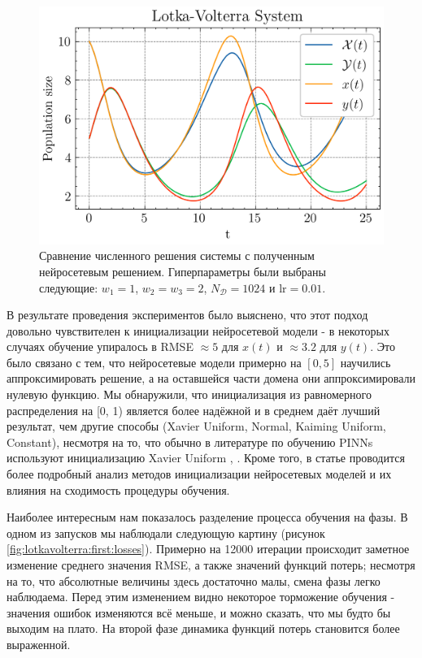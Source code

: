 \documentclass[a4paper, 12pt]{article}
\begin{document}
\begin{figure}
    \centering
    \includegraphics{../images/lotkavolterra/first approach/Lotka-Volterra System.png}
    \caption{Сравнение численного решения системы с полученным нейросетевым решением. Гиперпараметры были выбраны следующие: $w_1 = 1$, $w_2 = w_3 = 2$, $N_\mathcal{D} = 1024$ и $\mathrm{lr} = 0.01$.}
    \label{fig:lotkavolterra:first:solution}
\end{figure}

В результате проведения экспериментов было выяснено, что этот подход довольно чувствителен к инициализации нейросетевой модели - в некоторых случаях обучение упиралось в RMSE $\approx 5$ для $x(t)$ и $\approx 3.2$ для $y(t)$. Это было связано с тем, что нейросетевые модели примерно на $[0, 5]$ научились аппроксимировать решение, а на оставшейся части домена они аппроксимировали нулевую функцию. Мы обнаружили, что инициализация из равномерного распределения на [0, 1) является более надёжной и в среднем даёт лучший результат, чем другие способы (Xavier Uniform, Normal, Kaiming Uniform, Constant), несмотря на то, что обычно в литературе по обучению PINNs используют инициализацию Xavier Uniform \cite{rathore2024challenges}, \cite{wang2020pinns}. Кроме того, в статье \cite{Pang_2019} проводится более подробный анализ методов инициализации нейросетевых моделей и их влияния на сходимость процедуры обучения.

Наиболее интересным нам показалось разделение процесса обучения на фазы. В одном из запусков мы наблюдали следующую картину (рисунок \ref{fig:lotkavolterra:first:losses}). Примерно на 12000 итерации происходит заметное изменение среднего значения RMSE, а также значений функций потерь; несмотря на то, что абсолютные величины здесь достаточно малы, смена фазы легко наблюдаема. Перед этим изменением видно некоторое торможение обучения - значения ошибок изменяются всё меньше, и можно сказать, что мы будто бы выходим на плато. На второй фазе динамика функций потерь становится более выраженной.
\end{document}
